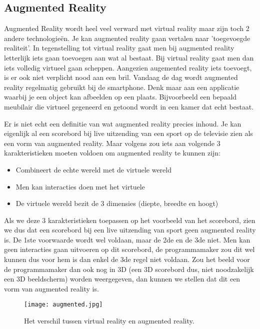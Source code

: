 \subsection{Augmented Reality}
\label{subsec:augmented-reality}
Augmented Reality wordt heel veel verward met virtual reality maar zijn toch 2 andere technologieën. Je kan augmented reality gaan vertalen naar 'toegevoegde realiteit'. In tegenstelling tot virtual reality gaat men bij augmented reality letterlijk iets gaan toevoegen aan wat al bestaat. Bij virtual reality gaat men dan iets volledig virtueel gaan scheppen. Aangezien augemented reality iets toevoegt, is er ook niet verplicht nood aan een bril. Vandaag de dag wordt augmented reality regelmatig gebruikt bij de smartphone. Denk maar aan een applicatie waarbij je een object kan afbeelden op een plaats. Bijvoorbeeld een bepaald meubilair die virtueel gegeneerd en getoond wordt in een kamer dat echt bestaat.

Er is niet echt een definitie van wat augmented reality precies inhoud. Je kan eigenlijk al een scorebord bij live uitzending van een sport op de televisie zien als een vorm van augmented reality. Maar volgens \autocite{Azuma1997} zou iets aan volgende 3 karakteristieken moeten voldoen om augmented reality te kunnen zijn:

\begin{itemize}
	\item Combineert de echte wereld met de virtuele wereld
	\item Men kan interacties doen met het virtuele
	\item De virtuele wereld bezit de 3 dimensies (diepte, breedte en hoogt)
\end{itemize}

Als we deze 3 karakteristieken toepassen op het voorbeeld van het scorebord, zien we dus dat een scorebord bij een live uitzending van sport geen augmented reality is. De 1ste voorwaarde wordt wel voldaan, maar de 2de en de 3de niet. Men kan geen interacties gaan uitvoeren op dit scorebord, de programmamaker zou dit wel kunnen dus voor hem is dan enkel de 3de regel niet voldaan. Zou het beeld voor de programmamaker dan ook nog in 3D (een 3D scorebord dus, niet noodzakelijk een 3D beeldscherm) worden weergegeven, dan kunnen we stellen dat dit een vorm van augmented reality is.

\begin{figure}
	\centering
	\texttt{[image: augmented.jpg]}
	\caption{Het verschil tussen virtual reality en augmented reality.}
	\label{fig:augmented}
\end{figure}


